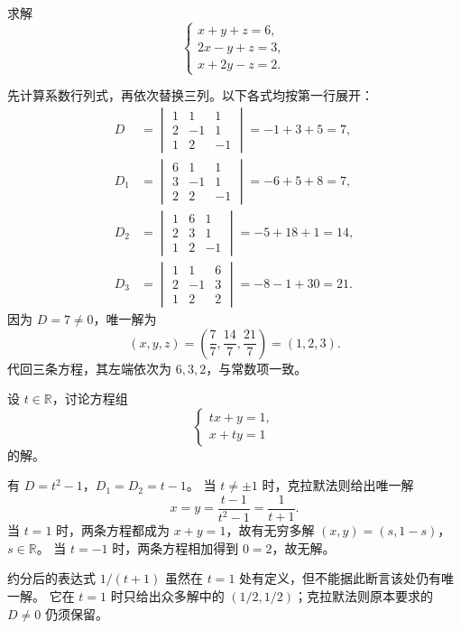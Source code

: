 \documentclass[UTF8,12pt,a4paper,fontset=fandol]{ctexart}
\begin{document}
\begin{example}[三元方程组]
求解
\[
  \begin{cases}
    x+y+z=6,\\
    2x-y+z=3,\\
    x+2y-z=2.
  \end{cases}
\]
\end{example}

\begin{solve}
先计算系数行列式，再依次替换三列。以下各式均按第一行展开：
\begin{align*}
  D&=\begin{vmatrix}1&1&1\\2&-1&1\\1&2&-1\end{vmatrix}
     =-1+3+5=7,\\
  D_1&=\begin{vmatrix}6&1&1\\3&-1&1\\2&2&-1\end{vmatrix}
     =-6+5+8=7,\\
  D_2&=\begin{vmatrix}1&6&1\\2&3&1\\1&2&-1\end{vmatrix}
     =-5+18+1=14,\\
  D_3&=\begin{vmatrix}1&1&6\\2&-1&3\\1&2&2\end{vmatrix}
     =-8-1+30=21.
\end{align*}
因为 $D=7\ne0$，唯一解为
\[
  (x,y,z)=\left(\frac77,\frac{14}7,\frac{21}7\right)=(1,2,3).
\]
代回三条方程，其左端依次为 $6,3,2$，与常数项一致。
\end{solve}

\begin{example}[含参数时先讨论分母]
设 $t\in\mathbb R$，讨论方程组
\[
  \begin{cases}tx+y=1,\\x+ty=1\end{cases}
\]
的解。
\end{example}

\begin{solve}
有 $D=t^2-1$，$D_1=D_2=t-1$。
当 $t\ne\pm1$ 时，克拉默法则给出唯一解
\[
  x=y=\frac{t-1}{t^2-1}=\frac1{t+1}.
\]
当 $t=1$ 时，两条方程都成为 $x+y=1$，故有无穷多解
$(x,y)=(s,1-s)$，$s\in\mathbb R$。
当 $t=-1$ 时，两条方程相加得到 $0=2$，故无解。

约分后的表达式 $1/(t+1)$ 虽然在 $t=1$ 处有定义，但不能据此断言该处仍有唯一解。
它在 $t=1$ 时只给出众多解中的 $(1/2,1/2)$；克拉默法则原本要求的 $D\ne0$ 仍须保留。
\end{solve}
\end{document}
